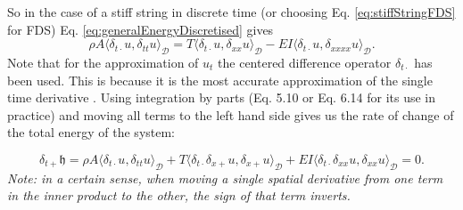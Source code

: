 \documentclass{article}
\begin{document}
So in the case of a stiff string in discrete time (or choosing Eq. \eqref{eq:stiffStringFDS} for FDS) Eq. \eqref{eq:generalEnergyDiscretised} gives
\begin{equation}
     \rho A \langle \delta_{t\cdot}u, \delta_{tt} u\rangle_\mathcal{D} = T \langle \delta_{t\cdot}u, \delta_{xx}u\rangle_\mathcal{D} - EI \langle \delta_{t\cdot}u, \delta_{xxxx}u \rangle_\mathcal{D}.
\end{equation}
Note that for the approximation of $u_t$ the centered difference operator $\delta_{t\cdot}$ has been used. This is because it is the most accurate approximation of the single time derivative \cite{Bilbao2009}. Using integration by parts (Eq. 5.10 or Eq. 6.14 for its use in practice) and moving all terms to the left hand side gives us the rate of change of the total energy of the system:

\begin{equation}\label{eq:rateOfChangeEnergyString}
     \delta_{t+}\mathfrak{h} = \rho A \langle \delta_{t\cdot}u, \delta_{tt} u\rangle_\mathcal{D} + T \langle \delta_{t\cdot}\delta_{x+}u, \delta_{x+}u\rangle_\mathcal{D} + EI \langle \delta_{t\cdot}\delta_{xx}u, \delta_{xx}u \rangle_\mathcal{D} = 0.
\end{equation}
\textit{Note: in a certain sense, when moving a single spatial derivative from one term in the inner product to the other, the sign of that term inverts.
}
\end{document}
